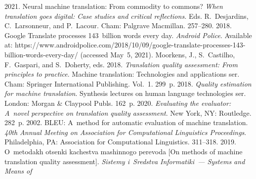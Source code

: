 




  \begin{multicols}{2}

\renewcommand{\bibname}{\protect\rmfamily References}

{\small\frenchspacing
 {%
 \begin{thebibliography}{99}
 2021. Neural machine translation: From commodity to commons? \textit{When 
translation goes digital: Case studies and critical reflections.} 
Eds. R.~Desjardins, C.~Larsonneur, and P.~Lacour. Cham: Palgrave Macmillan. 
257--280.
 2018.
Google Translate processes 143~billion words every day. \textit{Android Police}. Available at: 
{\sf https://www.androidpolice.com/2018/10/09/google-translate-processes-143-billion-words-every-day/} 
(accessed May~5, 2021).
Moorkens, J., S.~Castilho, F.~Gaspari, and S.~Doherty, eds. 2018. \textit{Translation quality assessment:
From principles to practice}. 
Machine translation: Technologies and applications ser. Cham: Springer International Publishing. Vol.~1. 
299~p.
 2018. \textit{Quality estimation for machine translation}. 
Synthesis lectures on
human language technologies ser.
London: Morgan \& Claypool Publs. 162~p.
 2020. \textit{Evaluating the evaluator: A~novel perspective on translation quality assessment}. 
New York, NY: Routledge. 282~p.
 2002. BLEU: A~method for automatic 
evaluation of machine translation. \textit{40th Annual Meeting on Association for Computational Linguistics 
Proceedings}. Philadelphia, PA: Association for Computational Linguistics. 311--318.
 2019. O~metodakh otsenki kachestva mashinnogo perevoda [On methods of 
machine translation quality assessment]. \textit{Sistemy i~Sredstva Informatiki~--- Systems and Means of 
}
\end{thebibliography}}}
\end{multicols}
